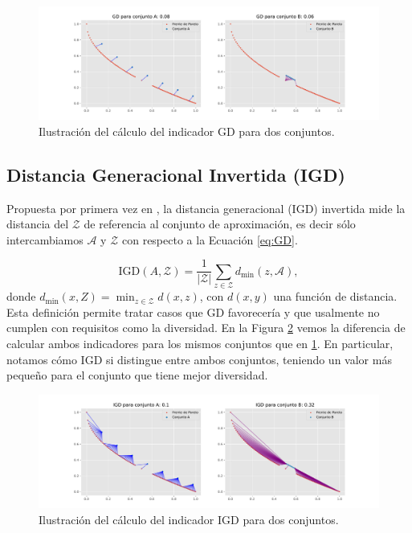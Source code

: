 \begin{figure}[H]
    \centering
    \includegraphics[width=\textwidth]{Figuras/GD_demo.pdf}
    \caption[GD]{Ilustración del cálculo del indicador GD para dos conjuntos.}
    \label{fig:GD_demo}
\end{figure}

\subsection{Distancia Generacional Invertida (IGD)} \label{sec:IGD}
Propuesta por primera vez en \cite{IGD}, la distancia generacional (IGD) invertida mide la distancia del $\mathcal{Z}$ de referencia al conjunto de aproximación, es decir sólo intercambiamos $\mathcal{A}$ y $\mathcal{Z}$ con respecto a la Ecuación \ref{eq:GD}.

\begin{equation} \label{eq:IGD}
    \text{IGD}(A,\mathcal{Z})=\frac{1}{|\mathcal{Z}|}\sum_{z\in\mathcal{Z}} d_{\min}(z,\mathcal{A}), \nonumber
\end{equation}
donde $d_{\min}(x,Z)=\min_{z \in \mathcal{Z}}{d(x,z)}$, con $d(x,y)$ una función de distancia. Esta definición permite tratar casos que GD favorecería y que usalmente no cumplen con requisitos como la diversidad. En la Figura \ref{fig:IGD_demo} vemos la diferencia de calcular ambos indicadores para los mismos conjuntos que en \ref{fig:GD_demo}. En particular, notamos cómo IGD si distingue entre ambos conjuntos, teniendo un valor más pequeño para el conjunto que tiene mejor diversidad.

\begin{figure}[H]
    \centering
    \includegraphics[width=\textwidth]{Figuras/IGD_demo.pdf}
    \caption[IGD]{Ilustración del cálculo del indicador IGD para dos conjuntos.}
    \label{fig:IGD_demo}
\end{figure}


